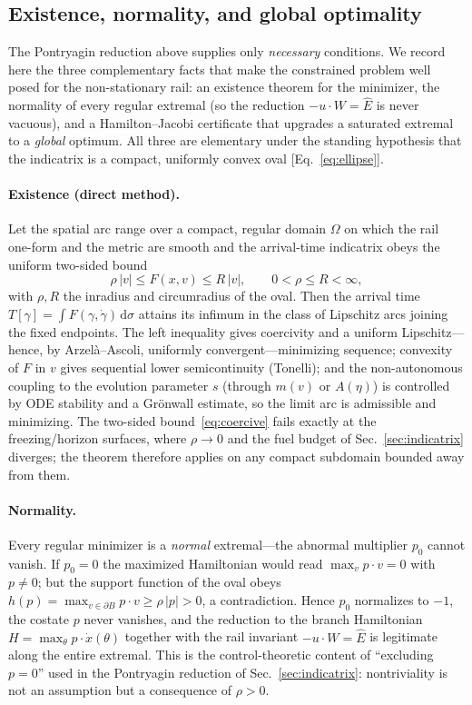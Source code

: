 \documentclass[
    aps, prd, twocolumn, superscriptaddress,
    showpacs, nofootinbib, floatfix
]{revtex4-2}
\newcommand{\Ehat}{\hat E}
\newcommand{\dd}{\mathrm{d}}
\begin{document}
\subsection{Existence, normality, and global optimality}
\label{sec:control-foundations}
The Pontryagin reduction above supplies only \emph{necessary} conditions. We
record here the three complementary facts that make the constrained problem well
posed for the non-stationary rail: an existence theorem for the minimizer, the
normality of every regular extremal (so the reduction $-u\cdot W=\Ehat$ is never
vacuous), and a Hamilton--Jacobi certificate that upgrades a saturated extremal to
a \emph{global} optimum. All three are elementary under the standing hypothesis
that the indicatrix is a compact, uniformly convex oval [Eq.~\eqref{eq:ellipse}].

\paragraph{Existence (direct method).} Let the spatial arc range over a compact,
regular domain $\Omega$ on which the rail one-form and the metric are smooth and
the arrival-time indicatrix obeys the uniform two-sided bound
\begin{equation}
  \rho\,|v| \le F(x,v) \le R\,|v|, \qquad 0<\rho\le R<\infty,
  \label{eq:coercive}
\end{equation}
with $\rho,R$ the inradius and circumradius of the oval. Then the arrival time
$T[\gamma]=\int F(\gamma,\dot\gamma)\,\dd\sigma$ attains its infimum in the class
of Lipschitz arcs joining the fixed endpoints. The left inequality gives
coercivity and a uniform Lipschitz---hence, by Arzel\`a--Ascoli, uniformly
convergent---minimizing sequence; convexity of $F$ in $v$ gives sequential lower
semicontinuity (Tonelli); and the non-autonomous coupling to the evolution
parameter $s$ (through $m(v)$ or $A(\eta)$) is controlled by ODE stability and a
Gr\"onwall estimate, so the limit arc is admissible and minimizing. The two-sided
bound~\eqref{eq:coercive} fails exactly at the freezing/horizon surfaces, where
$\rho\to0$ and the fuel budget of Sec.~\ref{sec:indicatrix} diverges; the theorem
therefore applies on any compact subdomain bounded away from them.

\paragraph{Normality.} Every regular minimizer is a \emph{normal} extremal---the
abnormal multiplier $p_0$ cannot vanish. If $p_0=0$ the maximized Hamiltonian
would read $\max_v p\cdot v=0$ with $p\neq0$; but the support function of the oval
obeys $h(p)=\max_{v\in\partial B}p\cdot v\ge\rho\,|p|>0$, a contradiction. Hence
$p_0$ normalizes to $-1$, the costate $p$ never vanishes, and the reduction to the
branch Hamiltonian $H=\max_\theta p\cdot\dot x(\theta)$ together with the rail
invariant $-u\cdot W=\Ehat$ is legitimate along the entire extremal. This is the
control-theoretic content of ``excluding $p=0$'' used in the Pontryagin reduction
of Sec.~\ref{sec:indicatrix}: nontriviality is not an assumption but a consequence
of $\rho>0$.
\end{document}
